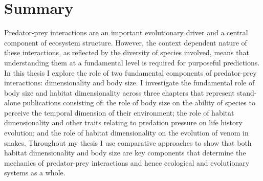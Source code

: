 \chapter*{Summary}

Predator-prey interactions are an important evolutionary driver and a central component of ecosystem structure. However, the context dependent nature of these interactions, as reflected by the diversity of species involved, means that understanding them at a fundamental level is required for purposeful predictions. In this thesis I explore the role of two fundamental components of predator-prey interactions: dimensionality and body size. I investigate the fundamental role of body size and habitat dimensionality across three chapters that represent stand-alone publications consisting of: the role of body size on the ability of species to perceive the temporal dimension of their environment; the role of habitat dimensionality and other traits relating to predation pressure on life history evolution; and the role of habitat dimensionality on the evolution of venom in snakes. Throughout my thesis I use comparative approaches to show that both habitat dimensionality and body size are key components that determine the mechanics of predator-prey interactions and hence ecological and evolutionary systems as a whole.

